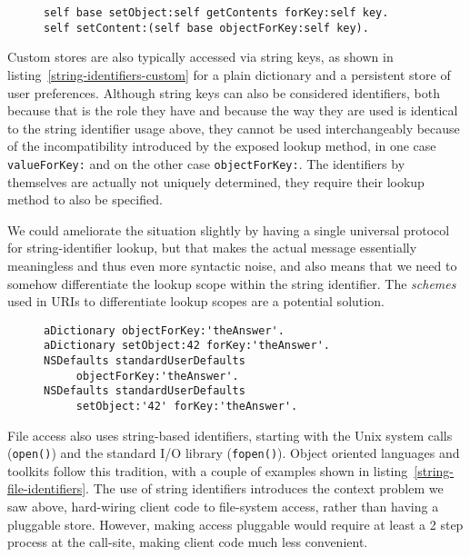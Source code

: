 \documentclass[preprint,authoryear]{llncs}
\begin{document}
\begin{figure}[htbp]
\begin{lstlisting}[style=numbers,label=kvc-variable-string,caption=Parametrized access via KVC.]
self base setObject:self getContents forKey:self key.
self setContent:(self base objectForKey:self key).
\end{lstlisting}
\end{figure}

Custom stores are also typically accessed via string keys, as shown in listing~\ref{string-identifiers-custom} for
a plain dictionary and a persistent store of user preferences.  Although string keys can also be considered 
identifiers, both because that is the role they have and because the way they are used is identical to
the string identifier usage above, they cannot be used interchangeably because of the incompatibility
introduced by the exposed lookup method, in one case {\tt valueForKey:} and on the other case {\tt objectForKey:}.
The identifiers by themselves are actually not uniquely determined, they require their lookup method to also
be specified.


We could ameliorate the situation slightly by having a single universal protocol
for string-identifier lookup, but that makes the actual message essentially
meaningless and thus even more syntactic noise, and also means that we need
to somehow differentiate the lookup scope within the string identifier.   The
\emph{schemes} used in URIs to differentiate lookup scopes are a potential
solution.


\begin{figure}[htbp]
\begin{lstlisting}[style=numbers,label=string-identifiers-custom,caption=String-based identifiers for custom storage.]
aDictionary objectForKey:'theAnswer'.
aDictionary setObject:42 forKey:'theAnswer'.
NSDefaults standardUserDefaults
	 objectForKey:'theAnswer'.
NSDefaults standardUserDefaults
	 setObject:'42' forKey:'theAnswer'.
\end{lstlisting}
\end{figure}


File access also uses string-based identifiers, starting with the Unix system calls ({\tt open()}) and the standard I/O library ({\tt fopen()}).
Object oriented languages and toolkits follow this tradition, with a couple of examples shown in listing~\ref{string-file-identifiers}.
The use of string identifiers introduces the context problem we saw above, hard-wiring client code to file-system access,
rather than having a pluggable store.   However, making access pluggable would require at least a 2 step process at the
call-site, making client code much less convenient.  
\end{document}
